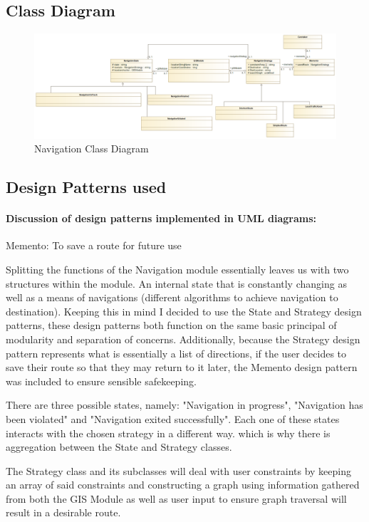 	\subsection{Class Diagram}
	\begin{figure}[H]
	\includegraphics[width=\linewidth]{Navigation/NavigationModuleClassDiagram(v2_noMethods).png}
	\caption{Navigation Class Diagram}
	\label{fig:UML1}
	\end{figure}
	
	\subsection{Design Patterns used}
	\paragraph{Discussion of design patterns implemented in UML diagrams:}
		Memento: To save a route for future use
		
		Splitting the functions of the Navigation module essentially leaves us with two structures within the module. An internal state that is constantly changing as well as a means of navigations (different algorithms to achieve navigation to destination). Keeping this in mind I decided to use the State and Strategy design patterns, these design patterns both function on the same basic principal of modularity and separation of concerns. Additionally, because the Strategy design pattern represents what is essentially a list of directions, if the user decides to save their route so that they may return to it later, the Memento design pattern was included to ensure sensible safekeeping.
		
		There are three possible states, namely: "Navigation in progress", "Navigation has been violated" and "Navigation exited successfully". Each one of these states interacts with the chosen strategy in a different way. which is why there is aggregation between the State and Strategy classes.
		
		The Strategy class and its subclasses will deal with user constraints by keeping an array of said constraints and constructing a graph using information gathered from both the GIS Module as well as user input to ensure graph traversal will result in a desirable route. 
	
